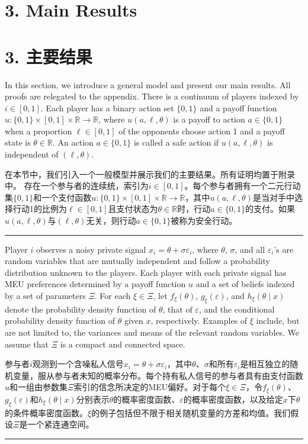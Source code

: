 \documentclass[12pt,a4paper]{article}
\newenvironment{original}
  {\par\medskip\noindent\color{black}\ignorespaces}
  {\par\medskip}
\newenvironment{translation}
  {\par\noindent\color{darkblue}\ignorespaces}
  {\par\medskip\noindent\hrule\par\medskip}
\theoremstyle{definition}
\theoremstyle{remark}
\begin{document}
\section{3. Main Results}
\section*{\color{darkblue}3. 主要结果}

\begin{original}
In this section, we introduce a general model and present our main results. All proofs are relegated to the appendix.
There is a continuum of players indexed by $i \in [0, 1]$. Each player has a binary action set $\{0, 1\}$ and a payoff function $u \colon \{0, 1\} \times [0, 1] \times \mathbb{R} \to \mathbb{R}$, where $u(a, \ell, \theta)$ is a payoff to action $a \in \{0, 1\}$ when a proportion $\ell \in [0, 1]$ of the opponents choose action 1 and a payoff state is $\theta \in \mathbb{R}$. An action $a \in \{0, 1\}$ is called a safe action if $u(a, \ell, \theta)$ is independent of $(\ell, \theta)$.
\end{original}
\begin{translation}
在本节中，我们引入一个一般模型并展示我们的主要结果。所有证明均置于附录中。
存在一个参与者的连续统，索引为$i \in [0, 1]$。每个参与者拥有一个二元行动集$\{0, 1\}$和一个支付函数$u \colon \{0, 1\} \times [0, 1] \times \mathbb{R} \to \mathbb{R}$，其中$u(a, \ell, \theta)$是当对手中选择行动1的比例为$\ell \in [0, 1]$且支付状态为$\theta \in \mathbb{R}$时，行动$a \in \{0, 1\}$的支付。如果$u(a, \ell, \theta)$与$(\ell, \theta)$无关，则行动$a \in \{0, 1\}$被称为安全行动。
\end{translation}

\begin{original}
Player $i$ observes a noisy private signal $x_i = \theta + \sigma \varepsilon_i$, where $\theta$, $\sigma$, and all $\varepsilon_i$'s are random variables that are mutually independent and follow a probability distribution unknown to the players. Each player with each private signal has MEU preferences determined by a payoff function $u$ and a set of beliefs indexed by a set of parameters $\Xi$. For each $\xi \in \Xi$, let $f_\xi(\theta)$, $g_\xi(\varepsilon)$, and $h_\xi(\theta \mid x)$ denote the probability density function of $\theta$, that of $\varepsilon$, and the conditional probability density function of $\theta$ given $x$, respectively. Examples of $\xi$ include, but are not limited to, the variances and means of the relevant random variables. We assume that $\Xi$ is a compact and connected space.
\end{original}
\begin{translation}
参与者$i$观测到一个含噪私人信号$x_i = \theta + \sigma \varepsilon_i$，其中$\theta$、$\sigma$和所有$\varepsilon_i$是相互独立的随机变量，服从参与者未知的概率分布。每个持有私人信号的参与者具有由支付函数$u$和一组由参数集$\Xi$索引的信念所决定的MEU偏好。对于每个$\xi \in \Xi$，令$f_\xi(\theta)$、$g_\xi(\varepsilon)$和$h_\xi(\theta \mid x)$分别表示$\theta$的概率密度函数、$\varepsilon$的概率密度函数，以及给定$x$下$\theta$的条件概率密度函数。$\xi$的例子包括但不限于相关随机变量的方差和均值。我们假设$\Xi$是一个紧连通空间。
\end{translation}
\end{document}
